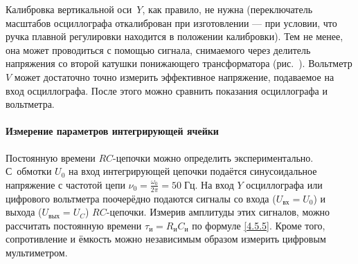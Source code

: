 Калибровка вертикальной оси~$Y$, как правило, не нужна
(переключатель масштабов осциллографа откалиброван при изготовлении ---
при условии, что ручка плавной регулировки находится в положении
калибровки). Тем не менее, она может проводиться с помощью сигнала,
снимаемого через делитель напряжения со второй катушки понижающего трансформатора
(рис.~). Вольтметр $V$ может достаточно точно
измерить эффективное напряжение, подаваемое на вход осциллографа. После
этого можно сравнить показания осциллографа и вольтметра.

\paragraph{Измерение параметров интегрирующей ячейки}
Постоянную времени $RC$-цепочки можно определить экспериментально.
С~обмотки $U_0$ на вход интегрирующей цепочки подаётся синусоидальное напряжение
с частотой цепи $\nu_0=\frac{\omega_0}{2\pi}=50\;Гц$.
На вход $Y$ осциллографа или цифрового вольтметра поочерёдно
подаются сигналы со входа ($U_\text{вх}=U_0$) и выхода ($U_\text{вых} = U_C$)
$RC$-цепочки. Измерив амплитуды этих сигналов, можно рассчитать постоянную
времени $\tau_{и}= R_{и}C_{и}$ по формуле \eqref{4.5.5}.
Кроме того, сопротивление и ёмкость можно независимым образом измерить
цифровым мультиметром.

